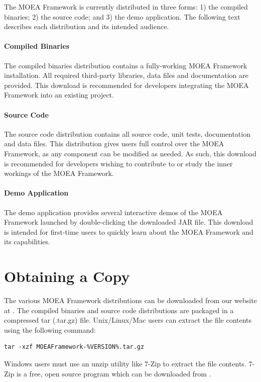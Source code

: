 The MOEA Framework is currently distributed in three forms: 1) the compiled binaries; 2) the source code; and 3) the demo application.  The following text describes each distribution and its intended audience.

\paragraph{Compiled Binaries}
The compiled binaries distribution contains a fully-working MOEA Framework installation.  All required third-party libraries, data files and documentation are provided.  This download is recommended for developers integrating the MOEA Framework into an existing project.

\paragraph{Source Code}
The source code distribution contains all source code, unit tests, documentation and data files.  This distribution gives users full control over the MOEA Framework, as any component can be modified as needed.  As such, this download is recommended for developers wishing to contribute to or study the inner workings of the MOEA Framework.

\paragraph{Demo Application}
The demo application provides several interactive demos of the MOEA Framework launched by double-clicking the downloaded JAR file.  This download is intended for first-time users to quickly learn about the MOEA Framework and its capabilities.

\section{Obtaining a Copy}

The various MOEA Framework distributions can be downloaded from our website at .  The compiled binaries and source code distributions are packaged in a compressed tar (.tar.gz) file.  Unix/Linux/Mac users can extract the file contents using the following command:

\begin{lstlisting}[language=Plaintext]
tar -xzf MOEAFramework-%VERSION%.tar.gz
\end{lstlisting}

\noindent
Windows users must use an unzip utility like 7-Zip to extract the file contents.  7-Zip is a free, open source program which can be downloaded from .

